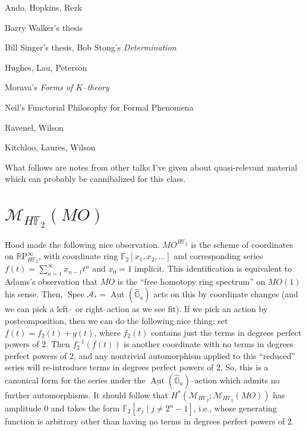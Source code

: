 \documentclass{amsart}
\newcommand{\F}{\mathbb F}
\newcommand{\G}{\mathbb G}
\newcommand{\R}{\mathbb R}
\newcommand{\RP}{\R\mathrm P}
\newcommand{\<}{\langle}
\renewcommand{\>}{\rangle}
\newcommand{\context}[1]{\mathcal{M}_{#1}}
\DeclareMathOperator{\Spec}{Spec}
\theoremstyle{plain}
\theoremstyle{definition}
\theoremstyle{remark}
\begin{document}
Ando, Hopkins, Rezk

Barry Walker's thesis

Bill Singer's thesis, Bob Stong's \textit{Determination}

Hughes, Lau, Peterson

Morava's \textit{Forms of $K$--theory}

Neil's Functorial Philosophy for Formal Phenomena

Ravenel, Wilson

Kitchloo, Laures, Wilson

\newpage
\newpage
\newpage

\vspace{20\baselineskip}

\begin{center}
What follows are notes from other talks I've given about quasi-relevant material which can probably be cannibalized for this class.
\end{center}

\newpage


\section{$\context{H\F_2}(MO)$}

Hood made the following nice observation. $MO^{H\F_2}$ is the scheme of coordinates on $\RP^\infty_{H\F_2}$, with coordinate ring $\F_2[x_1, x_2, \ldots]$ and corresponding series $f(t) = \sum_{n=1}^\infty x_{n-1} t^n$ and $x_0 = 1$ implicit. This identification is equivalent to Adams's observation that $MO$ is the ``free homotopy ring spectrum'' on $MO(1)$ his sense. Then, $\Spec \mathcal{A}_* = \underline{\operatorname{Aut}}(\widehat{\G}_a)$ acts on this by coordinate changes (and we can pick a left-- or right--action as we see fit). If we pick an action by postcomposition, then we can do the following nice thing: set $f(t) = f_2(t) + g(t)$, where $f_2(t)$ contains just the terms in degrees perfect powers of $2$. Then $f_2^{-1}(f(t))$ is another coordinate with no terms in degrees perfect powers of $2$, and any nontrivial automorphism applied to this ``reduced'' series will re-introduce terms in degrees perfect powers of $2$.  So, this is a canonical form for the series under the $\underline{\operatorname{Aut}}(\widehat{\mathbb G}_a)$--action which admits no further automorphisms. It should follow that $H^*(\context{H\F_2}; \context{H\F_2}(MO))$ has amplitude $0$ and takes the form $\F_2[x_j \mid j \ne 2^n - 1]$, i.e., whose generating function is arbitrary other than having no terms in degrees perfect powers of $2$.
\end{document}
